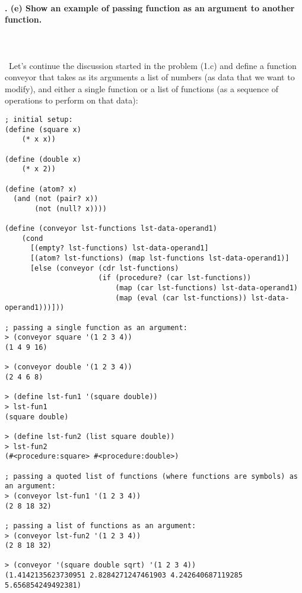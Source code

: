 \documentclass{article}
\begin{document}
\paragraph{. (e) Show an example of passing function as an argument to another function.}\
\paragraph{}\
Let's continue the discussion started in the problem (1.c) and define a function conveyor that takes as its arguments a list of numbers (as data that we want to modify), and either a single function or a list of functions (as a sequence of operations to perform on that data):
\begin{verbatim} 
; initial setup:
(define (square x)
    (* x x))

(define (double x)
    (* x 2))
    
(define (atom? x)
  (and (not (pair? x))
       (not (null? x))))    
    
(define (conveyor lst-functions lst-data-operand1)
    (cond
      [(empty? lst-functions) lst-data-operand1]
      [(atom? lst-functions) (map lst-functions lst-data-operand1)]
      [else (conveyor (cdr lst-functions)
                      (if (procedure? (car lst-functions))
                          (map (car lst-functions) lst-data-operand1)
                          (map (eval (car lst-functions)) lst-data-operand1)))]))

; passing a single function as an argument:                          
> (conveyor square '(1 2 3 4))
(1 4 9 16)

> (conveyor double '(1 2 3 4))
(2 4 6 8)

> (define lst-fun1 '(square double))
> lst-fun1
(square double)

> (define lst-fun2 (list square double))
> lst-fun2
(#<procedure:square> #<procedure:double>)

; passing a quoted list of functions (where functions are symbols) as an argument:
> (conveyor lst-fun1 '(1 2 3 4))
(2 8 18 32)

; passing a list of functions as an argument:
> (conveyor lst-fun2 '(1 2 3 4))
(2 8 18 32)

> (conveyor '(square double sqrt) '(1 2 3 4))
(1.4142135623730951 2.8284271247461903 4.242640687119285 5.656854249492381)
\end{verbatim}

\paragraph{}\
\end{document}
